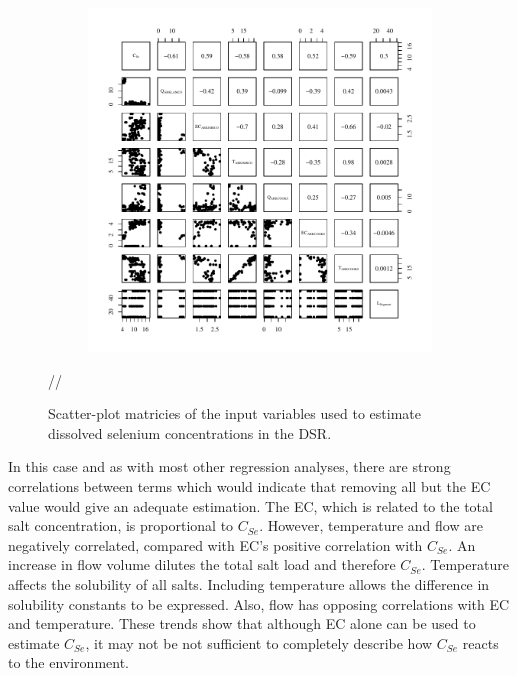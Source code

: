 \subfiguremid
\begin{landscape}
	\begin{figure}
		\begin{subfigure}{0.7\textwidth}
			\centering
			\includegraphics[width=\tableCustomSize]{"Figures/Results_DSR/Stochastic/Conc Model Full PairsDDIV"}
		\end{subfigure}//
		\caption{Scatter-plot matricies of the input variables used to estimate dissolved selenium concentrations in the DSR.}
	\end{figure}
\end{landscape}
\subfiguretop

In this case and as with most other regression analyses, there are strong correlations between terms which would indicate that removing all but the EC value would give an adequate estimation.  The EC, which is related to the total salt concentration, is proportional to $C_{Se}$.  However, temperature and flow are negatively correlated, compared with EC's positive correlation with $C_{Se}$.  An increase in flow volume dilutes the total salt load and therefore $C_{Se}$.  Temperature affects the solubility of all salts.  Including temperature allows the difference in solubility constants to be expressed.  Also, flow has opposing correlations with EC and temperature.  These trends show that although EC alone can be used to estimate $C_{Se}$, it may not be not sufficient to completely describe how $C_{Se}$ reacts to the environment.

